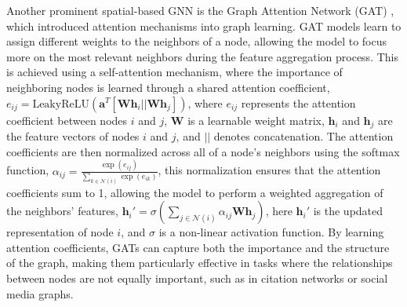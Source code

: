 Another prominent spatial-based GNN is the Graph Attention Network (GAT) \cite{velickovic2017graph}, which introduced attention mechanisms into graph learning. GAT models learn to assign different weights to the neighbors of a node, allowing the model to focus more on the most relevant neighbors during the feature aggregation process. This is achieved using a self-attention mechanism, where the importance of neighboring nodes is learned through a shared attention coefficient, $
e_{ij} = \text{LeakyReLU}(\mathbf{a}^T [\mathbf{W} \mathbf{h}_i || \mathbf{W} \mathbf{h}_j]) $, where $e_{ij}$ represents the attention coefficient between nodes $i$ and $j$, $\mathbf{W}$ is a learnable weight matrix, $\mathbf{h}_i$ and $\mathbf{h}_j$ are the feature vectors of nodes $i$ and $j$, and $||$ denotes concatenation. The attention coefficients are then normalized across all of a node's neighbors using the softmax function, $
\alpha_{ij} = \frac{\exp(e_{ij})}{\sum_{k \in \mathcal{N}(i)} \exp(e_{ik})}
$, this normalization ensures that the attention coefficients sum to 1, allowing the model to perform a weighted aggregation of the neighbors' features, $
\mathbf{h}_i' = \sigma \left( \sum_{j \in \mathcal{N}(i)} \alpha_{ij} \mathbf{W} \mathbf{h}_j \right)$,
here $\mathbf{h}_i'$ is the updated representation of node $i$, and $\sigma$ is a non-linear activation function. By learning attention coefficients, GATs can capture both the importance and the structure of the graph, making them particularly effective in tasks where the relationships between nodes are not equally important, such as in citation networks or social media graphs.
